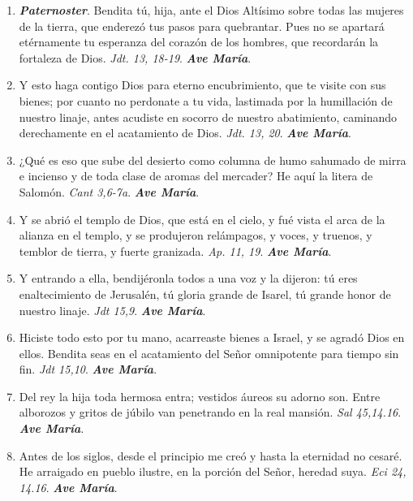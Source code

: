 \documentclass[../../devocionario.tex]{subfiles}
\begin{document}
    \begin{enumerate}
    
        \item \textbf{\textit{Paternoster}}. Bendita tú, hija, ante el Dios Altísimo sobre todas las mujeres de la tierra, 
            que enderezó tus pasos para quebrantar. Pues no se apartará etérnamente tu esperanza del corazón de los hombres, 
            que recordarán la fortaleza de Dios. \textit{Jdt. 13, 18-19}. \textbf{\textit{Ave María}}.

        \item Y esto haga contigo Dios para eterno encubrimiento, que te visite con sus bienes; por cuanto no perdonate a tu vida, 
            lastimada por la humillación de nuestro linaje, antes acudiste en socorro de nuestro abatimiento, 
            caminando derechamente en el acatamiento de Dios. \textit{Jdt. 13, 20}. \textbf{\textit{Ave María}}.

        \item ¿Qué es eso que sube del desierto como columna de humo sahumado de mirra e incienso y de toda clase de aromas del mercader? 
            He aquí la litera de Salomón. \textit{Cant 3,6-7a}. \textbf{\textit{Ave María}}.

        \item Y se abrió el templo de Dios, que está en el cielo, y fué vista el arca de la alianza en el templo, 
            y se produjeron relámpagos, y voces, y truenos, y temblor de tierra, y fuerte granizada. \textit{Ap. 11, 19}. \textbf{\textit{Ave María}}.

        \item Y entrando a ella, bendijéronla todos a una voz y la dijeron: tú eres enaltecimiento de Jerusalén, 
            tú gloria grande de Isarel, tú grande honor de nuestro linaje. \textit{Jdt 15,9}. \textbf{\textit{Ave María}}.

        \item Hiciste todo esto por tu mano, acarreaste bienes a Israel, y se agradó Dios en ellos. 
            Bendita seas en el acatamiento del Señor omnipotente para tiempo sin fin. \textit{Jdt 15,10}. \textbf{\textit{Ave María}}.

        \item Del rey la hija toda hermosa entra; vestidos áureos su adorno son. Entre alborozos y gritos de 
            júbilo van penetrando en la real mansión. \textit{Sal 45,14.16}. \textbf{\textit{Ave María}}.

        \item Antes de los siglos, desde el principio me creó y hasta la eternidad no cesaré. 
            He arraigado en pueblo ilustre, en la porción del Señor, heredad suya. \textit{Eci 24, 14.16}. \textbf{\textit{Ave María}}.


\end{enumerate}
\end{document}

